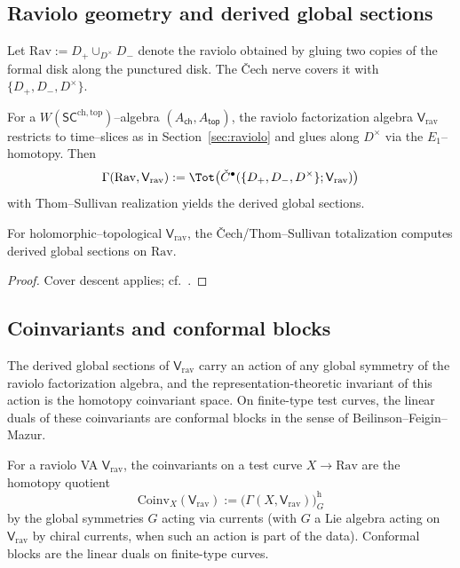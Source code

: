 \subsection{Raviolo geometry and derived global sections}
\label{subsec:raviolo-geometry}
Let $\mathrm{Rav}:=D_+\cup_{D^\times}D_-$ denote the raviolo obtained by gluing two copies of the formal disk along the punctured disk. The Čech nerve covers it with $\{D_+,D_-,D^\times\}$.
\begin{definition}
\label{def:raviolo-FA}
For a $W(\mathsf{SC}^{\mathrm{ch,top}})$–algebra $(A_{\mathsf{ch}},A_{\mathsf{top}})$, the raviolo factorization algebra $\mathsf V_{\mathrm{rav}}$ restricts to time–slices as in Section~\ref{sec:raviolo} and glues along $D^\times$ via the $E_1$–homotopy. Then
\[
\Gamma(\mathrm{Rav},\mathsf V_{\mathrm{rav}})
:= \Tot\bigl(\check{C}^\bullet(\{D_+,D_-,D^\times\};\mathsf V_{\mathrm{rav}})\bigr)
\]
with Thom–Sullivan realization yields the derived global sections.
\end{definition}
\begin{proposition}
\label{prop:Cech-exactness}
For holomorphic–topological $\mathsf V_{\mathrm{rav}}$, the Čech/Thom–Sullivan totalization computes derived global sections on $\mathrm{Rav}$.
\end{proposition}
\begin{proof}
Cover descent applies; cf.\ \cite{CG17,GW23}.
\end{proof}

\subsection{Coinvariants and conformal blocks}
\label{subsec:coinvariants}

The derived global sections of $\mathsf V_{\mathrm{rav}}$ carry an
action of any global symmetry of the raviolo factorization algebra,
and the representation-theoretic invariant of this action is the
homotopy coinvariant space. On finite-type test curves, the linear
duals of these coinvariants are conformal blocks in the sense of
Beilinson--Feigin--Mazur.

\begin{definition}[Coinvariants]
\label{def:coinvariants}
For a raviolo VA $\mathsf V_{\mathrm{rav}}$, the coinvariants on a test curve $X\to\mathrm{Rav}$ are the homotopy quotient
\[
\mathrm{Coinv}_X(\mathsf V_{\mathrm{rav}}) := \bigl(\Gamma(X,\mathsf V_{\mathrm{rav}})\bigr)_{G}^{\mathrm{h}}
\]
by the global symmetries $G$ acting via currents (with $G$ a Lie algebra acting on~$\mathsf V_{\mathrm{rav}}$ by chiral currents, when such an action is part of the data). Conformal blocks are the linear duals on finite-type curves.
\end{definition}

